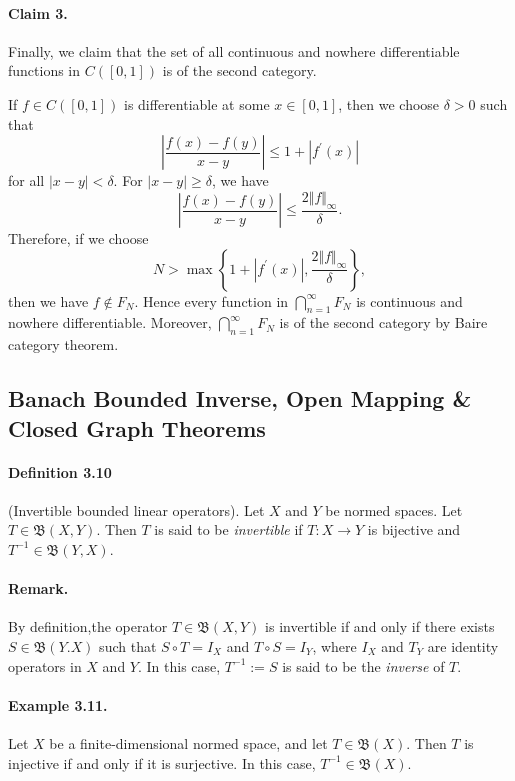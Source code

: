 \documentclass{article}
\begin{document}
\paragraph{Claim 3.} Finally, we claim that the set of all continuous and nowhere differentiable functions in $C([0,1])$ is of the second category.\vspace{0.1cm}

If $f\in C([0,1])$ is differentiable at some $x\in[0,1]$, then we choose $\delta>0$ such that $$\left\vert\frac{f(x)-f(y)}{x-y}\right\vert\leq 1+\left\vert f^\prime(x)\right\vert$$ 
for all $\vert x-y\vert <\delta$. For $\vert x - y\vert \geq\delta$, we have $$\left\vert\frac{f(x)-f(y)}{x-y}\right\vert\leq \frac{2\Vert f\Vert_\infty}{\delta}.$$ 
Therefore, if we choose $$N>\max\left\{1+\left\vert f^\prime(x)\right\vert,\frac{2\Vert f\Vert_\infty}{\delta}\right\},$$ then we have $f\notin F_N.$ Hence every function in $\bigcap_{n=1}^\infty F_N$ is continuous and nowhere differentiable. Moreover, $\bigcap_{n=1}^\infty F_N$ is of the second category by Baire category theorem.

\newpage
\subsection{Banach Bounded Inverse, Open Mapping \& Closed Graph Theorems}
\paragraph{Definition 3.10\label{def:3.10}} (Invertible bounded linear operators). Let $X$ and $Y$ be normed spaces. Let $T\in\mathfrak{B}(X,Y)$. Then $T$ is said to be \textit{invertible} if $T:X\to Y$ is bijective and $T^{-1}\in\mathfrak{B}(Y,X)$.
\paragraph{Remark.} By definition,the operator $T\in\mathfrak{B}(X,Y)$ is invertible if and only if there exists $S\in\mathfrak{B}(Y.X)$ such that $S\circ T=I_X$ and $T\circ S=I_Y$, where $I_X$ and $T_Y$ are identity operators in $X$ and $Y$. In this case, $T^{-1}:= S$ is said to be the \textit{inverse} of $T$.
\paragraph{Example 3.11.\label{example:3.11}} Let $X$ be a finite-dimensional normed space, and let $T\in\mathfrak{B}(X)$. Then $T$ is injective if and only if it is surjective. In this case, $T^{-1}\in\mathfrak{B}(X)$.\vspace{0.1cm}
\end{document}
